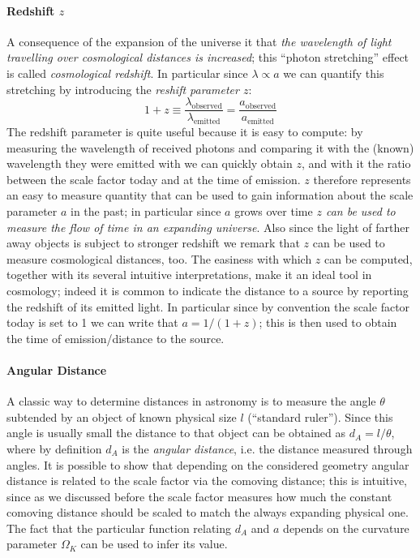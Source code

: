 \paragraph{Redshift $z$}
A consequence of the expansion of the universe it that \emph{the wavelength of light travelling over cosmological distances is increased}; this ``photon stretching'' effect is called \emph{cosmological redshift}. 
In particular since $\lambda\propto a$ we can quantify this stretching by introducing the \emph{reshift parameter $z$}:
\begin{equation*}
    1+z \equiv \frac{\lambda_{\text{observed}}}{\lambda_{\text{emitted}}} = \frac{a_{\text{observed}}}{a_{\text{emitted}}}
\end{equation*}
The redshift parameter is quite useful because it is easy to compute: by measuring the wavelength of received photons and comparing it with the (known) wavelength they were emitted with we can quickly obtain $z$, and with it the ratio between the scale factor today and at the time of emission. $z$ therefore represents an easy to measure quantity that can be used to gain information about the scale parameter $a$ in the past; in particular since $a$ grows over time \emph{$z$ can be used to measure the flow of time in an expanding universe}. Also since the light of farther away objects is subject to stronger redshift we remark that $z$ can be used to measure cosmological distances, too. The easiness with which $z$ can be computed, together with its several intuitive interpretations, make it an ideal tool in cosmology; indeed it is common to indicate the distance to a source by reporting the redshift of its emitted light.
In particular since by convention the scale factor today is set to 1 we can write that $a = 1/(1+z)$; this is then used to obtain the time of emission/distance to the source.

\paragraph{Angular Distance}
A classic way to determine distances in astronomy is to measure the angle $\theta$ subtended by an object of known physical size $l$ (``standard ruler''). Since this angle is usually small the distance to that object can be obtained as $d_A = l/\theta$, where by definition $d_A$ is the \emph{angular distance}, i.e. the distance measured through angles.
It is possible to show that depending on the considered geometry angular distance is related to the scale factor via the comoving distance; this is intuitive, since as we discussed before the scale factor measures how much the constant comoving distance should be scaled to match the always expanding physical one. 
The fact that the particular function relating $d_A$ and $a$ depends on the curvature parameter $\Omega_K$ can be used to infer its value.


